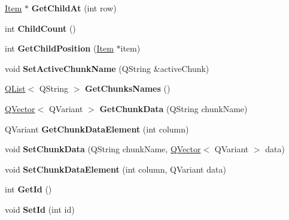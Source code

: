 \begin{DoxyCompactItemize}
\item 
\hyperlink{class_item}{Item} $\ast$ {\bfseries Get\+Child\+At} (int row)\hypertarget{class_item_a80ac5f26c6d125de147b2c5aae8631c7}{}\label{class_item_a80ac5f26c6d125de147b2c5aae8631c7}

\item 
int {\bfseries Child\+Count} ()\hypertarget{class_item_a9324d6e789340e65394bea357954e6e1}{}\label{class_item_a9324d6e789340e65394bea357954e6e1}

\item 
int {\bfseries Get\+Child\+Position} (\hyperlink{class_item}{Item} $\ast$item)\hypertarget{class_item_afccf539d108a9b083b67105ccb548f11}{}\label{class_item_afccf539d108a9b083b67105ccb548f11}

\item 
void {\bfseries Set\+Active\+Chunk\+Name} (Q\+String \&active\+Chunk)\hypertarget{class_item_accef83c1103296fc80b30a809e7ae293}{}\label{class_item_accef83c1103296fc80b30a809e7ae293}

\item 
\hyperlink{class_q_list}{Q\+List}$<$ Q\+String $>$ {\bfseries Get\+Chunks\+Names} ()\hypertarget{class_item_a68ce6aeeb3977fda454f680811de37a4}{}\label{class_item_a68ce6aeeb3977fda454f680811de37a4}

\item 
\hyperlink{class_q_vector}{Q\+Vector}$<$ Q\+Variant $>$ {\bfseries Get\+Chunk\+Data} (Q\+String chunk\+Name)\hypertarget{class_item_adbc518bc597ca7a811dc4ec9dad3e51b}{}\label{class_item_adbc518bc597ca7a811dc4ec9dad3e51b}

\item 
Q\+Variant {\bfseries Get\+Chunk\+Data\+Element} (int column)\hypertarget{class_item_a6f25765ce2c56248e04d04ebec90d34d}{}\label{class_item_a6f25765ce2c56248e04d04ebec90d34d}

\item 
void {\bfseries Set\+Chunk\+Data} (Q\+String chunk\+Name, \hyperlink{class_q_vector}{Q\+Vector}$<$ Q\+Variant $>$ data)\hypertarget{class_item_a0617312073b3d751518cfd6269c25c0a}{}\label{class_item_a0617312073b3d751518cfd6269c25c0a}

\item 
void {\bfseries Set\+Chunk\+Data\+Element} (int column, Q\+Variant data)\hypertarget{class_item_a2206a4c379b351c9cbbe2406399d2b30}{}\label{class_item_a2206a4c379b351c9cbbe2406399d2b30}

\item 
int {\bfseries Get\+Id} ()\hypertarget{class_item_a3466b4b51b244ccbcac853ee7240af47}{}\label{class_item_a3466b4b51b244ccbcac853ee7240af47}

\item 
void {\bfseries Set\+Id} (int id)\hypertarget{class_item_a46a50959228845fc8d4c1a1e3cdfc9a3}{}\label{class_item_a46a50959228845fc8d4c1a1e3cdfc9a3}

\end{DoxyCompactItemize}
